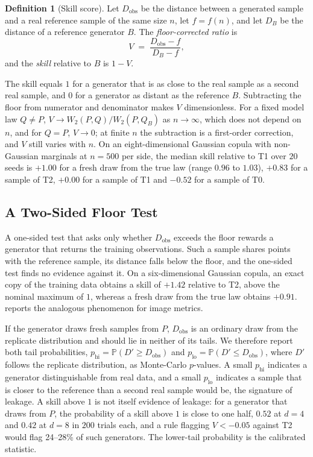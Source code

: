 \documentclass[twoside,11pt]{article}
\theoremstyle{plain}
\theoremstyle{definition}
\newtheorem{defn}{Definition}
\theoremstyle{remark}
\newcommand{\Wtwo}{\ensuremath{W_2}}
\newcommand{\Prob}{\ensuremath{\mathbb{P}}}
\begin{document}
\begin{defn}[Skill score]\label{def:skill}
Let $D_{\mathrm{obs}}$ be the distance between a generated sample and a real
reference sample of the same size $n$, let $f = f(n)$, and let $D_B$ be the
distance of a reference generator $B$. The \emph{floor-corrected ratio} is
\begin{equation}\label{eq:skill}
  V \;=\; \frac{D_{\mathrm{obs}} - f}{D_B - f},
\end{equation}
and the \emph{skill} relative to $B$ is $1 - V$.
\end{defn}

The skill equals $1$ for a generator that is as close to the real sample as
a second real sample, and $0$ for a generator as distant as the reference
$B$. Subtracting the floor from numerator and denominator makes $V$
dimensionless. For a fixed model law $Q \neq P$, $V \to \Wtwo(P,Q)/\Wtwo(P,Q_B)$
as $n \to \infty$, which does not depend on $n$, and for $Q = P$,
$V \to 0$; at finite $n$ the subtraction is a first-order correction, and
$V$ still varies with $n$. On an eight-dimensional Gaussian copula with non-Gaussian marginals at $n = 500$ per side, the median skill relative to T1 over $20$ seeds is $+1.00$ for a fresh draw from the true law (range $0.96$ to $1.03$), $+0.83$ for a sample of T2, $+0.00$ for a sample of T1 and $-0.52$ for a sample of T0.

\subsection{A Two-Sided Floor Test}\label{sec:reporting-twosided}

A one-sided test that asks only whether $D_{\mathrm{obs}}$ exceeds the floor
rewards a generator that returns the training observations. Such a sample
shares points with the reference sample, its distance falls below the
floor, and the one-sided test finds no evidence against it. On a
six-dimensional Gaussian copula, an exact copy of the training data obtains
a skill of $+1.42$ relative to T2, above the nominal maximum of $1$, whereas
a fresh draw from the true law obtains $+0.91$. \citet{chen2026} reports the
analogous phenomenon for image metrics.

If the generator draws fresh samples from $P$, $D_{\mathrm{obs}}$ is an
ordinary draw from the replicate distribution and should lie in neither of
its tails. We therefore report both tail probabilities,
$p_{\mathrm{hi}} = \Prob(D' \geq D_{\mathrm{obs}})$ and
$p_{\mathrm{lo}} = \Prob(D' \leq D_{\mathrm{obs}})$, where $D'$ follows the
replicate distribution, as Monte-Carlo $p$-values. A small $p_{\mathrm{hi}}$ indicates a generator
distinguishable from real data, and a small $p_{\mathrm{lo}}$ indicates a
sample that is closer to the reference than a second real sample would be,
the signature of leakage. A skill above $1$ is not itself evidence of
leakage: for a generator that draws from $P$, the probability of a skill
above $1$ is close to one half, $0.52$ at $d = 4$ and $0.42$ at $d = 8$ in
$200$ trials each, and a rule flagging $V < -0.05$ against T2 would flag
24--28\% of such generators. The lower-tail probability is the calibrated
statistic.
\end{document}
